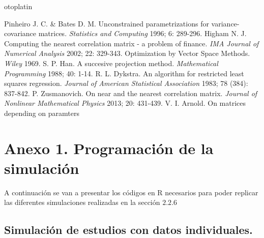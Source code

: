 otoplatin\documentclass[a4paper,openright,12pt]{report}
\begin{document}
\begin{thebibliography}{99}
 Pinheiro J. C. \& Bates D. M. Unconstrained parametrizations for variance-covariance matrices. \textit{Statistics and Computing} 1996; 6: 289-296.
 Higham N. J. Computing the nearest correlation matrix - a problem of finance. \textit{IMA Journal of Numerical Analysis} 2002; 22: 329-343. 
 Optimization by Vector Space Methods. \textit{Wiley} 1969.
 S. P. Han. A succesive projection method. \textit{Mathematical Programming} 1988; 40: 1-14.
 R. L. Dykstra. An algorithm for restricted least squares regression. \textit{Journal of American Statistical Association} 1983; 78 (384): 837-842.
 P. Zusmanovich. On near and the nearest correlation matrix. \textit{Journal of Nonlinear Mathematical Physics} 2013; 20: 431-439.
 V. I. Arnold. On matrices depending on paramters
\end{thebibliography}

\chapter{Anexo 1. Programación de la simulación}\label{cap.simulacion}
A continuación se van a presentar los códigos en R necesarios para poder replicar las diferentes simulaciones realizadas en la sección $2.2.6$
\section{Simulación de estudios con datos individuales.}
\end{document}
